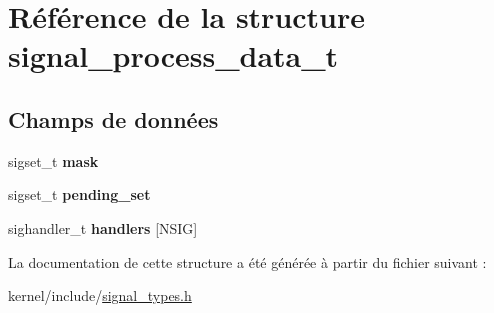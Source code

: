 \hypertarget{structsignal__process__data__t}{\section{\-Référence de la structure signal\-\_\-process\-\_\-data\-\_\-t}
\label{structsignal__process__data__t}
}
\subsection*{\-Champs de données}
\begin{DoxyCompactItemize}
\item 
\hypertarget{structsignal__process__data__t_a397d720abbb70447cb1837012fa808e8}{sigset\-\_\-t {\bfseries mask}}\label{structsignal__process__data__t_a397d720abbb70447cb1837012fa808e8}

\item 
\hypertarget{structsignal__process__data__t_a072dbf9762b10b9b8b545622fcbfef92}{sigset\-\_\-t {\bfseries pending\-\_\-set}}\label{structsignal__process__data__t_a072dbf9762b10b9b8b545622fcbfef92}

\item 
\hypertarget{structsignal__process__data__t_acfd78d7210d6b09d6ffcf8d5c0ed8c24}{sighandler\-\_\-t {\bfseries handlers} \mbox{[}\-N\-S\-I\-G\mbox{]}}\label{structsignal__process__data__t_acfd78d7210d6b09d6ffcf8d5c0ed8c24}

\end{DoxyCompactItemize}


\-La documentation de cette structure a été générée à partir du fichier suivant \-:\begin{DoxyCompactItemize}
\item 
kernel/include/\hyperlink{signal__types_8h}{signal\-\_\-types.\-h}\end{DoxyCompactItemize}
